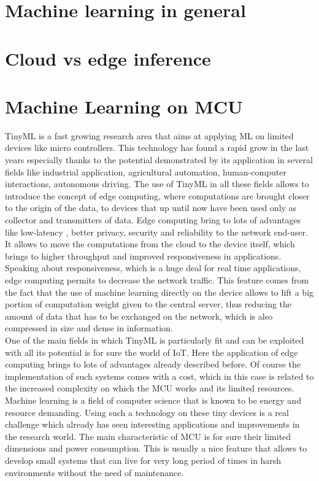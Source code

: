 \documentclass[12pt]{report}
\begin{document}
\section{Machine learning in general}

\section{Cloud vs edge inference}


\section{Machine Learning on MCU}
TinyML is a fast growing research area that aims at applying ML on limited devices like micro controllers. This technology has found a rapid grow in the last years especially thanks to the potential demonstrated by its application in several fields like industrial application, agricultural automation, human-computer interactions, autonomous driving. The use of TinyML in all these fields allows to introduce the concept of edge computing, where computations are brought closer to the origin of the data, to devices that up until now have been used only as collector and transmitters of data. Edge computing bring to lots of advantages like low-latency , better privacy, security and reliability to the network end-user. It allows to move the computations from the cloud to the device itself, which brings to higher throughput and improved responsiveness in applications. Speaking about responsiveness, which is a huge deal for real time applications, edge computing permits to decrease the network traffic. This feature comes from the fact that the use of machine learning directly on the device allows to lift a big portion of computation weight given to the central server, thus reducing the amount of data that has to be exchanged on the network, which is also compressed in size and dense in information. \\
One of the main fields in which TinyML is particularly fit and can be exploited with all its potential is for sure the world of IoT. Here the application of edge computing brings to lots of advantages already described before. Of course the implementation of such systems comes with a cost, which in this case is related to the increased complexity on which the MCU works and its limited resources. Machine learning is a field of computer science that is known to be energy and resource demanding. Using such a technology on these tiny devices is a real challenge which already has seen interesting applications and improvements in the research world. The main characteristic of MCU is for sure their limited dimensions and power consumption. This is usually a nice feature that allows to develop small systems that can live for very long period of times in harsh environments without the need of maintenance. 
\end{document}
